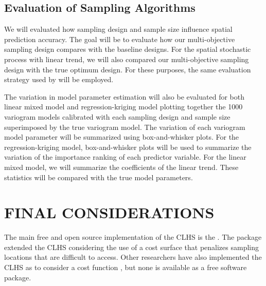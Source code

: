 \subsection{Evaluation of Sampling Algorithms}

We will evaluated how sampling design and sample size influence spatial prediction accuracy. The goal will be 
to evaluate how our multi-objective sampling design compares with the baseline designs. For the spatial 
stochastic process with linear trend, we will also compared our multi-objective sampling design with the true 
optimum design. For these purposes, the same evaluation strategy used by \cite{Samuel-RosaEtAl} will be 
employed.

The variation in model parameter estimation will also be evaluated for both linear mixed model and 
regression-kriging model plotting together the 1000 variogram models calibrated with each sampling design and 
sample size superimposed by the true variogram model. The variation of each variogram model parameter will be 
summarized using box-and-whisker plots. For the regression-kriging model, box-and-whisker plots will be used 
to summarize the variation of the importance ranking of each predictor variable. For the linear mixed model, 
we will summarize the coefficients of the linear trend. These statistics will be compared with the true model 
parameters.

\section{FINAL CONSIDERATIONS}

The main free and open source implementation of the CLHS is the  \cite{RoudierEtAl2012}. The 
package extended the CLHS considering the use of a cost surface that penalizes sampling locations that are 
difficult to access. Other researchers have also implemented the CLHS as to consider a cost function 
\cite{MulderEtAl2013, CliffordEtAl2014}, but none is available as a free software package.

